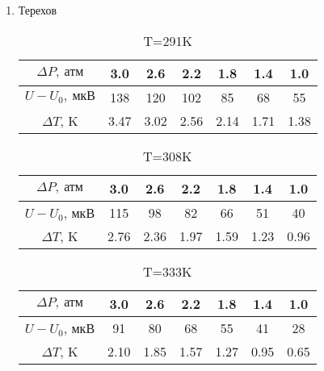 \documentclass[a4paper, 12pt]{article}
\begin{document}
\begin{enumerate}
    \item Терехов
    \begin{table}[ht!]

        \centering
        \begin{tabular}{|c|c|c|c|c|c|c|} \hline
            $\Delta P,\ \text{атм}$ & 3.0 & 2.6 & 2.2 & 1.8 & 1.4 & 1.0 \\ \hline
            $U-U_0,\ \text{мкВ}   $ & 138 & 120 & 102 & 85 & 68 & 55 \\ \hline
            $\Delta T$, K   & 3.47 & 3.02 & 2.56 & 2.14 & 1.71 & 1.38 \\ \hline
        \end{tabular}
            \caption{T=291K}
    \end{table}
    \begin{table}[ht!]
    
        \centering
        \begin{tabular}{|c|c|c|c|c|c|c|} \hline
            $\Delta P,\ \text{атм}$ & 3.0 & 2.6 & 2.2 & 1.8 & 1.4 & 1.0 \\ \hline
            $U-U_0$, мкВ    & 115 & 98 & 82 & 66 & 51 & 40 \\ \hline
            $\Delta T$, K   & 2.76 & 2.36 & 1.97 & 1.59 & 1.23 & 0.96 \\ \hline
        \end{tabular}
            \caption{T=308K}
    \end{table}
    \begin{table}[ht!]
        \centering
        \begin{tabular}{|c|c|c|c|c|c|c|} \hline
            $\Delta P,\ \text{атм}$ & 3.0 & 2.6 & 2.2 & 1.8 & 1.4 & 1.0 \\ \hline
            $U-U_0$, мкВ    & 91 & 80 & 68 & 55  & 41 & 28 \\ \hline
            $\Delta T$, K   & 2.10 & 1.85 & 1.57 & 1.27 & 0.95 & 0.65 \\ \hline
        \end{tabular}
            \caption{T=333K}
    \end{table}


\end{enumerate}
\end{document}
